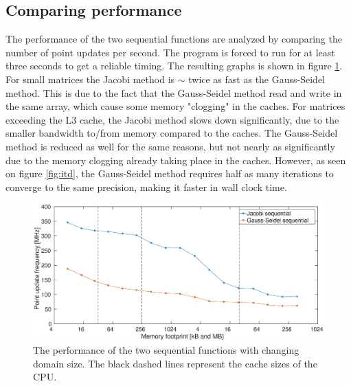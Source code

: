\subsection{Comparing performance}
The performance of the two sequential functions are analyzed by comparing the number of point updates per second. The program is forced to run for at least three seconds to get a reliable timing. The resulting graphs is shown in figure \ref{fig:seq_perf}. For small matrices the Jacobi method is $\sim$ twice as fast as the Gauss-Seidel method. This is due to the fact that the Gauss-Seidel method read and write in the same array, which cause some memory "clogging" in the caches. For matrices exceeding the L3 cache, the Jacobi method slows down significantly, due to the smaller bandwidth to/from memory compared to the caches. The Gauss-Seidel method is reduced as well for the same reasons, but not nearly as significantly due to the memory clogging already taking place in the caches. However, as seen on figure \ref{fig:itd}, the Gauss-Seidel method requires half as many iterations to converge to the same precision, making it faster in wall clock time.

\begin{figure}
\centering
\includegraphics[width = 1.1\textwidth]{fig/seq_perf.eps}
\caption{The performance of the two sequential functions with changing domain size. The black dashed lines represent the cache sizes of the CPU.}
\label{fig:seq_perf}
\end{figure}